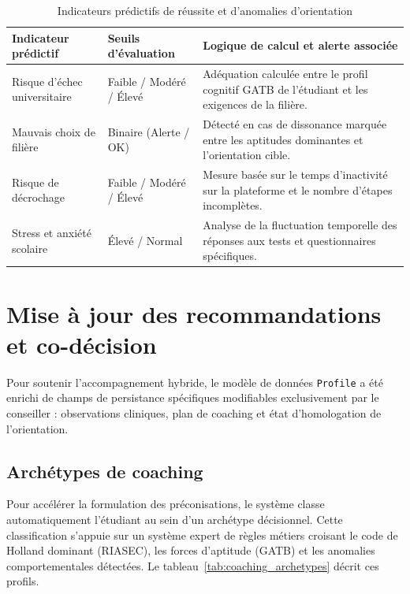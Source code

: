 \begin{table}[H]
\centering
\small
\begin{tabular}{|p{4.5cm}|p{2.5cm}|p{8cm}|}
\hline
\rowcolor{blue!15}
\textbf{Indicateur prédictif} & \textbf{Seuils d'évaluation} & \textbf{Logique de calcul et alerte associée} \\
\hline
Risque d'échec universitaire & Faible / Modéré / Élevé & Adéquation calculée entre le profil cognitif GATB de l'étudiant et les exigences de la filière. \\
\hline
Mauvais choix de filière & Binaire (Alerte / OK) & Détecté en cas de dissonance marquée entre les aptitudes dominantes et l'orientation cible. \\
\hline
Risque de décrochage & Faible / Modéré / Élevé & Mesure basée sur le temps d'inactivité sur la plateforme et le nombre d'étapes incomplètes. \\
\hline
Stress et anxiété scolaire & Élevé / Normal & Analyse de la fluctuation temporelle des réponses aux tests et questionnaires spécifiques. \\
\hline
\end{tabular}
\caption{Indicateurs prédictifs de réussite et d'anomalies d'orientation}
\label{tab:counselor_predictive}
\end{table}

\section{Mise à jour des recommandations et co-décision}
\label{sec:codecision}

Pour soutenir l'accompagnement hybride, le modèle de données \texttt{Profile} a été enrichi de champs de persistance spécifiques modifiables exclusivement par le conseiller : observations cliniques, plan de coaching et état d'homologation de l'orientation.

\subsection{Archétypes de coaching}

Pour accélérer la formulation des préconisations, le système classe automatiquement l'étudiant au sein d'un archétype décisionnel. Cette classification s'appuie sur un système expert de règles métiers croisant le code de Holland dominant (RIASEC), les forces d'aptitude (GATB) et les anomalies comportementales détectées. Le tableau~\ref{tab:coaching_archetypes} décrit ces profils.

